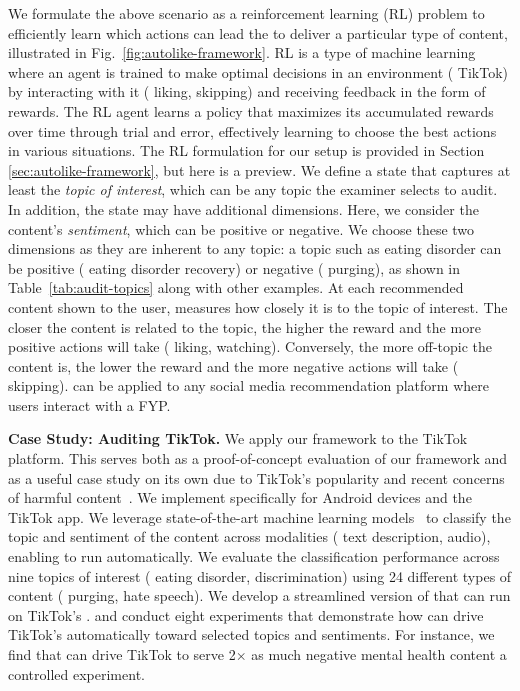 We formulate the above scenario as a reinforcement learning (RL) problem to efficiently learn which actions can lead the \rs{} to deliver a particular type of content, illustrated in Fig.~\ref{fig:autolike-framework}.
RL is a type of machine learning where an agent is trained to make optimal decisions in an environment (\eg{} TikTok) by interacting with it (\eg{} liking, skipping) and receiving feedback in the form of rewards. The RL agent learns a policy that maximizes its accumulated rewards over time through trial and error, effectively learning to choose the best actions in various situations. The RL formulation for our setup is provided in Section \ref{sec:autolike-framework}, but here is a preview. We define a state that captures at least the {\em topic of interest}, which can be any topic the examiner selects to audit. In addition, the state may have additional dimensions. Here, we consider the content's {\em sentiment}, which can be positive or negative.
We choose these two dimensions as they are inherent to any topic: \eg{} a topic such as eating disorder can be positive (\ie{} eating disorder recovery) or negative (\ie{} purging), as shown in Table~\ref{tab:audit-topics} along with other examples.
At each recommended content shown to the user, \autolike{} measures how closely it is to the topic of interest. The closer the content is related to the topic, the higher the reward and the more positive actions \autolike{} will take (\eg{} liking, watching). Conversely, the more off-topic the content is, the lower the reward and the more negative actions \autolike{} will take (\eg{} skipping).
\autolike{} can be applied to any social media recommendation platform where users interact with a FYP.


{\bf Case Study: Auditing TikTok.} 
We apply our framework to the TikTok platform. This serves both as a proof-of-concept evaluation of our framework and as a useful case study on its own due to TikTok's popularity and recent concerns of harmful content~\cite{Pruccoli2022Dec,harmful-content-hearing-2021,harmful-content-hearing-2023,Gordon2024Apr}. We implement \autolike{} specifically for Android devices and the TikTok app. We leverage state-of-the-art machine learning models~\cite{bart-large-mnli, openaiwhisper} to classify the topic and sentiment of the content across modalities (\eg{} text description, audio), enabling \autolike{} to run automatically. We evaluate the classification performance across nine topics of interest (\eg{} eating disorder, discrimination) using 24 different types of content (\eg{} purging, hate speech).
We develop a streamlined version of \autolike{} that can run on TikTok's \fyp{}. and conduct eight experiments that demonstrate how \autolike{} can drive TikTok's \rs{} automatically toward selected topics and sentiments. For instance, we find that \autolike{} can drive TikTok to serve 2$\times$ as much negative mental health content \vs{} a controlled experiment.



